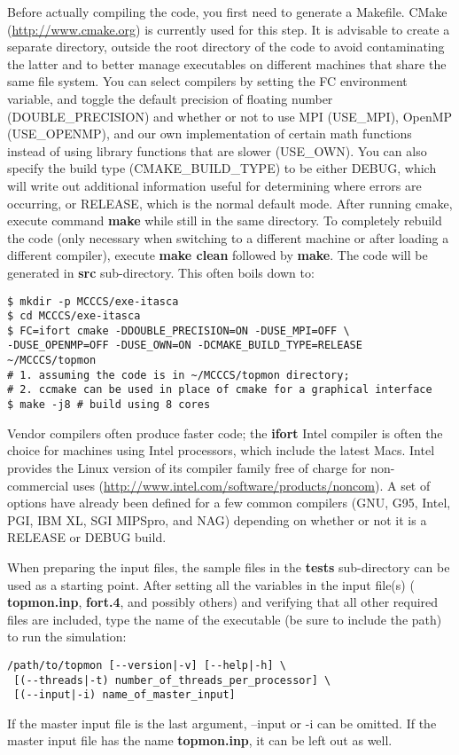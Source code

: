 \documentclass[12pt,letterpaper]{article}
\begin{document}
Before actually compiling the code, you first need to
generate a Makefile. CMake (\url{http://www.cmake.org}) is
currently used for this step. It is advisable to create a
separate directory, outside the root directory of the code
to avoid contaminating the latter and to better manage
executables on different machines that share the same file
system. You can select compilers by setting the FC
environment variable, and toggle the default precision of
floating number (DOUBLE\_PRECISION) and whether or not to
use MPI (USE\_MPI), OpenMP (USE\_OPENMP), and our own
implementation of certain math functions instead of using
library functions that are slower (USE\_OWN). You can also specify
the build type (CMAKE\_BUILD\_TYPE) to be either DEBUG, which will
write out additional information useful for determining where
errors are occurring, or RELEASE, which is the normal default mode. 
After running
cmake, execute command {\bf make} while still in the same
directory. To completely rebuild the code (only necessary
when switching to a different machine or after loading a
different compiler), execute {\bf make clean} followed by
{\bf make}. The code will be generated in {\bf src}
sub-directory. This often boils down to:
\begin{verbatim}
$ mkdir -p MCCCS/exe-itasca
$ cd MCCCS/exe-itasca
$ FC=ifort cmake -DDOUBLE_PRECISION=ON -DUSE_MPI=OFF \
-DUSE_OPENMP=OFF -DUSE_OWN=ON -DCMAKE_BUILD_TYPE=RELEASE ~/MCCCS/topmon
# 1. assuming the code is in ~/MCCCS/topmon directory;
# 2. ccmake can be used in place of cmake for a graphical interface
$ make -j8 # build using 8 cores
\end{verbatim}

Vendor compilers often produce faster code; the {\bf ifort}
Intel compiler is often the choice for machines using Intel
processors, which include the latest Macs. Intel provides
the Linux version of its compiler family free of charge for
non-commercial uses
(\url{http://www.intel.com/software/products/noncom}). A set
of options have already been defined for a few common
compilers (GNU, G95, Intel, PGI, IBM XL, SGI MIPSpro, and
NAG) depending on whether or not it is a RELEASE or DEBUG build.

When preparing the input files, the sample files in the {\bf
  tests} sub-directory can be used as a starting point.
After setting all the variables in the input file(s) ({\bf
  topmon.inp}, {\bf fort.4}, and possibly others) and
verifying that all other required files are included, type
the name of the executable (be sure to include the path) to
run the simulation:
\begin{verbatim}
/path/to/topmon [--version|-v] [--help|-h] \
 [(--threads|-t) number_of_threads_per_processor] \
 [(--input|-i) name_of_master_input]
\end{verbatim}
If the master input file is the last argument, --input or -i
can be omitted. If the master input file has the name {\bf
  topmon.inp}, it can be left out as well.
\end{document}
